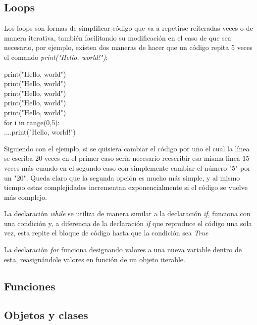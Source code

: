 \documentclass[10pt,a4paper]{article}
\begin{document}
\subsection{Loops}
Los loops son formas de simplificar código que va a repetirse reiteradas veces o de manera iterativa, también facilitando su modificación en el caso de que sea necesario, por ejemplo, existen dos maneras de hacer que un código repita 5 veces el comando \emph{print("Hello, world!")}:
\begin{multicols}{2}
	\noindent print("Hello, world")\\
	print("Hello, world")\\
	print("Hello, world")\\
	print("Hello, world")\\
	print("Hello, world")\\ 
	\vfill\null \columnbreak
	\noindent for i in range(0,5):\\
	....print("Hello, world!")
\end{multicols}
\noindent Siguiendo con el ejemplo, si se quisiera cambiar el código por uno el cual la línea se escriba 20 veces en el primer caso sería necesario reescribir esa misma linea 15 veces más cuando en el segundo caso con simplemente cambiar el número "5" por un "20". Queda claro que la segunda opción es mucho más simple, y al mismo tiempo estas complejidades incrementan exponencialmente si el código se vuelve más complejo.

\begin{description}[
align=right,
labelindent = 1cm,
labelsep=0.5cm,
itemindent=0cm]
	\item [while] La declaración \emph{while} se utiliza de manera similar a la declaración \emph{if}, funciona con una condición y, a diferencia de la declaración \emph{if} que reproduce el código una sola vez, esta repite el bloque de código hasta que la condición sea \emph{True}
	\item [for] La declaración \emph{for} funciona designando valores a una nueva variable dentro de esta, reasignándole valores en función de un objeto iterable.
\end{description}


\subsection{Funciones}

\subsection{Objetos y clases}
\end{document}
